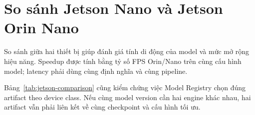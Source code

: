 \section{So sánh Jetson Nano và Jetson Orin Nano}

So sánh giữa hai thiết bị giúp đánh giá tính di động của model và mức mở rộng
hiệu năng. Speedup được tính bằng tỷ số FPS Orin/Nano trên cùng cấu hình model;
latency phải dùng cùng định nghĩa và cùng pipeline.

\begin{table}[H]
\centering
\caption{So sánh hiệu năng giữa Jetson Nano và Jetson Orin Nano}
\label{tab:jetson-comparison}
\end{table}

Bảng~\ref{tab:jetson-comparison} cũng kiểm chứng việc Model Registry chọn đúng
artifact theo device class. Nếu cùng model version cần hai engine khác nhau, hai
artifact vẫn phải liên kết về cùng checkpoint và cấu hình tối ưu.